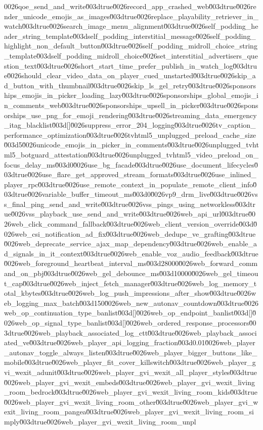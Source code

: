 {0026qoe_send_and_write\u003dtrue\u0026record_app_crashed_web\u003dtrue\u0026render_unicode_emojis_as_images\u003dtrue\u0026replace_playability_retriever_in_watch\u003dtrue\u0026search_image_menu_alignment\u003dtrue\u0026self_podding_header_string_template\u003dself_podding_interstitial_message\u0026self_podding_highlight_non_default_button\u003dtrue\u0026self_podding_midroll_choice_string_template\u003dself_podding_midroll_choice\u0026set_interstitial_advertisers_question_text\u003dtrue\u0026short_start_time_prefer_publish_in_watch_log\u003dtrue\u0026should_clear_video_data_on_player_cued_unstarted\u003dtrue\u0026skip_ad_button_with_thumbnail\u003dtrue\u0026skip_ls_gel_retry\u003dtrue\u0026sponsorships_emojis_in_picker_loading_lazy\u003dtrue\u0026sponsorships_global_emojis_in_comments_web\u003dtrue\u0026sponsorships_upsell_in_picker\u003dtrue\u0026sponsorships_use_png_for_emoji_rendering\u003dtrue\u0026streaming_data_emergency_itag_blacklist\u003d[]\u0026suppress_error_204_logging\u003dtrue\u0026tv_caption_performance_optimization\u003dtrue\u0026tvhtml5_unplugged_preload_cache_size\u003d5\u0026unicode_emojis_in_picker_in_comments\u003dtrue\u0026unplugged_tvhtml5_botguard_attestation\u003dtrue\u0026unplugged_tvhtml5_video_preload_on_focus_delay_ms\u003d0\u0026use_bg_facade\u003dtrue\u0026use_document_lifecycles\u003dtrue\u0026use_flare_get_approved_stream_formats\u003dtrue\u0026use_inlined_player_rpc\u003dtrue\u0026use_remote_context_in_populate_remote_client_info\u003dtrue\u0026variable_buffer_timeout_ms\u003d0\u0026vp9_drm_live\u003dtrue\u0026vss_final_ping_send_and_write\u003dtrue\u0026vss_pings_using_networkless\u003dtrue\u0026vss_playback_use_send_and_write\u003dtrue\u0026web_api_url\u003dtrue\u0026web_click_command_fallback\u003dtrue\u0026web_client_version_override\u003d\u0026web_csi_notification_ad_fix\u003dtrue\u0026web_dedupe_ve_grafting\u003dtrue\u0026web_deprecate_service_ajax_map_dependency\u003dtrue\u0026web_enable_ad_signals_in_it_context\u003dtrue\u0026web_enable_voz_audio_feedback\u003dtrue\u0026web_foreground_heartbeat_interval_ms\u003d28000\u0026web_forward_command_on_pbj\u003dtrue\u0026web_gel_debounce_ms\u003d10000\u0026web_gel_timeout_cap\u003dtrue\u0026web_inject_fetch_manager\u003dtrue\u0026web_log_memory_total_kbytes\u003dtrue\u0026web_log_push_impressions_after_show\u003dtrue\u0026web_logging_max_batch\u003d150\u0026web_new_autonav_countdown\u003dtrue\u0026web_op_continuation_type_banlist\u003d[]\u0026web_op_endpoint_banlist\u003d[]\u0026web_op_signal_type_banlist\u003d[]\u0026web_ordered_response_processors\u003dtrue\u0026web_playback_associated_log_ctt\u003dtrue\u0026web_playback_associated_ve\u003dtrue\u0026web_player_api_logging_fraction\u003d0.01\u0026web_player_autonav_toggle_always_listen\u003dtrue\u0026web_player_bigger_buttons_like_mobile\u003dtrue\u0026web_player_fit_cover_killswitch\u003dtrue\u0026web_player_gvi_wexit_adunit\u003dtrue\u0026web_player_gvi_wexit_all_player_styles\u003dtrue\u0026web_player_gvi_wexit_embeds\u003dtrue\u0026web_player_gvi_wexit_living_room_bedrock\u003dtrue\u0026web_player_gvi_wexit_living_room_kids\u003dtrue\u0026web_player_gvi_wexit_living_room_other\u003dtrue\u0026web_player_gvi_wexit_living_room_pangea\u003dtrue\u0026web_player_gvi_wexit_living_room_simply\u003dtrue\u0026web_player_gvi_wexit_living_room_unpl}
